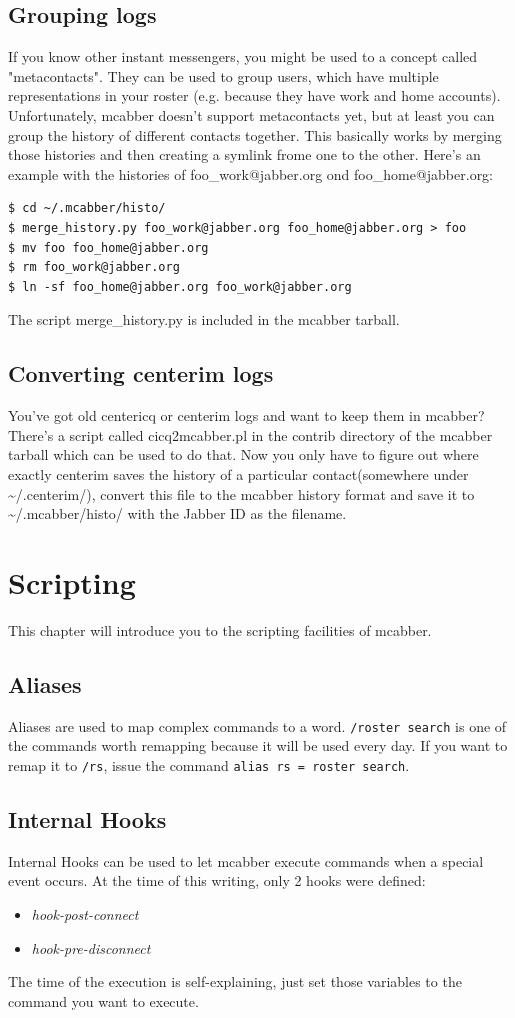 \documentclass[12pt,oneside,a4]{book}
\begin{document}
\section{Grouping logs}
If you know other instant messengers, you might be used to a concept called "metacontacts".
They can be used to group users, which have multiple representations in your
roster (e.g. because they have work and home accounts). Unfortunately, mcabber doesn't support
metacontacts yet, but at least you can group the history of different contacts together.
This basically works by merging those histories and then creating a symlink frome one to the other.
Here's an example with the histories of foo\_work@jabber.org ond foo\_home@jabber.org:
\begin{lstlisting}
$ cd ~/.mcabber/histo/
$ merge_history.py foo_work@jabber.org foo_home@jabber.org > foo
$ mv foo foo_home@jabber.org
$ rm foo_work@jabber.org
$ ln -sf foo_home@jabber.org foo_work@jabber.org
\end{lstlisting}
The script merge\_history.py is included in the mcabber tarball.
\section{Converting centerim logs}
You've got old centericq\cite{centericq} or centerim\cite{centerim} logs and want to keep
them in mcabber? There's a script called cicq2mcabber.pl in the contrib directory of the mcabber
tarball which can be used to do that. Now you only have to figure out where exactly
centerim saves the history of a particular contact(somewhere under \~{}/.centerim/),
convert this file to the mcabber history format and save it to \~{}/.mcabber/histo/ with the
Jabber ID as the filename.
\chapter{Scripting}
This chapter will introduce you to the scripting facilities of mcabber.
\section{Aliases}
Aliases are used to map complex commands to a word. \verb+/roster search+ is one of the commands worth remapping
because it will be used every day. If you want to remap it to \verb+/rs+,
issue the command \verb+alias rs = roster search+.
\section{Internal Hooks}
Internal Hooks can be used to let mcabber execute commands when a special event occurs.
At the time of this writing, only 2 hooks were defined:
\begin{itemize}
	\item \textit{hook-post-connect}
	\item \textit{hook-pre-disconnect}
\end{itemize}
The time of the execution is self-explaining, just set those variables to the command you want
to execute.
\end{document}
